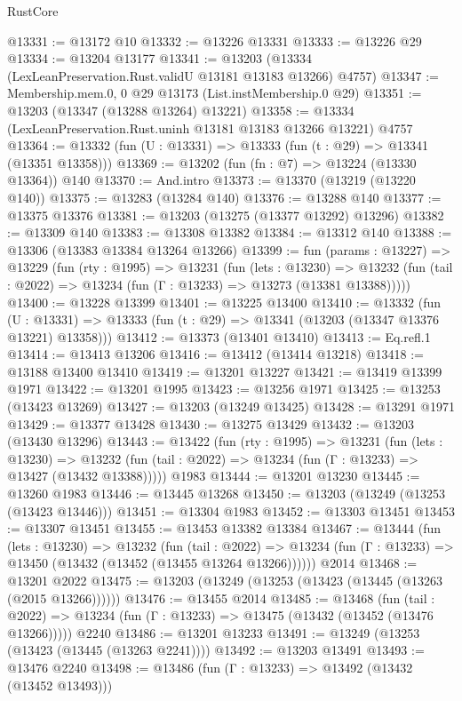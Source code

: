 \begin{lexlean}{RustCore}
\begin{coremodule}
@13331 := @13172 @10
@13332 := @13226 @13331
@13333 := @13226 @29
@13334 := @13204 @13177
@13341 := @13203 (@13334 (LexLeanPreservation.Rust.validU @13181 @13183 @13266) @4757)
@13347 := Membership.mem.{0, 0} @29 @13173 (List.instMembership.{0} @29)
@13351 := @13203 (@13347 (@13288 @13264) @13221)
@13358 := @13334 (LexLeanPreservation.Rust.uninh @13181 @13183 @13266 @13221) @4757
@13364 := @13332 (fun (U : @13331) => @13333 (fun (t : @29) => @13341 (@13351 @13358)))
@13369 := @13202 (fun (fn : @7) => @13224 (@13330 @13364)) @140
@13370 := And.intro
@13373 := @13370 (@13219 (@13220 @140))
@13375 := @13283 (@13284 @140)
@13376 := @13288 @140
@13377 := @13375 @13376
@13381 := @13203 (@13275 (@13377 @13292) @13296)
@13382 := @13309 @140
@13383 := @13308 @13382
@13384 := @13312 @140
@13388 := @13306 (@13383 @13384 @13264 @13266)
@13399 := fun (params : @13227) =>
  @13229
    (fun (rty : @1995) =>
    @13231
      (fun (lets : @13230) =>
      @13232 (fun (tail : @2022) => @13234 (fun (Γ : @13233) => @13273 (@13381 @13388)))))
@13400 := @13228 @13399
@13401 := @13225 @13400
@13410 := @13332
    (fun (U : @13331) => @13333 (fun (t : @29) => @13341 (@13203 (@13347 @13376 @13221) @13358)))
@13412 := @13373 (@13401 @13410)
@13413 := Eq.refl.{1}
@13414 := @13413 @13206
@13416 := @13412 (@13414 @13218)
@13418 := @13188 @13400 @13410
@13419 := @13201 @13227
@13421 := @13419 @13399 @1971
@13422 := @13201 @1995
@13423 := @13256 @1971
@13425 := @13253 (@13423 @13269)
@13427 := @13203 (@13249 @13425)
@13428 := @13291 @1971
@13429 := @13377 @13428
@13430 := @13275 @13429
@13432 := @13203 (@13430 @13296)
@13443 := @13422
    (fun (rty : @1995) =>
    @13231
      (fun (lets : @13230) =>
      @13232 (fun (tail : @2022) => @13234 (fun (Γ : @13233) => @13427 (@13432 @13388)))))
    @1983
@13444 := @13201 @13230
@13445 := @13260 @1983
@13446 := @13445 @13268
@13450 := @13203 (@13249 (@13253 (@13423 @13446)))
@13451 := @13304 @1983
@13452 := @13303 @13451
@13453 := @13307 @13451
@13455 := @13453 @13382 @13384
@13467 := @13444
    (fun (lets : @13230) =>
    @13232
      (fun (tail : @2022) =>
      @13234 (fun (Γ : @13233) => @13450 (@13432 (@13452 (@13455 @13264 @13266))))))
    @2014
@13468 := @13201 @2022
@13475 := @13203 (@13249 (@13253 (@13423 (@13445 (@13263 (@2015 @13266))))))
@13476 := @13455 @2014
@13485 := @13468
    (fun (tail : @2022) => @13234 (fun (Γ : @13233) => @13475 (@13432 (@13452 (@13476 @13266)))))
    @2240
@13486 := @13201 @13233
@13491 := @13249 (@13253 (@13423 (@13445 (@13263 @2241))))
@13492 := @13203 @13491
@13493 := @13476 @2240
@13498 := @13486 (fun (Γ : @13233) => @13492 (@13432 (@13452 @13493)))

\end{coremodule}
\end{lexlean}
